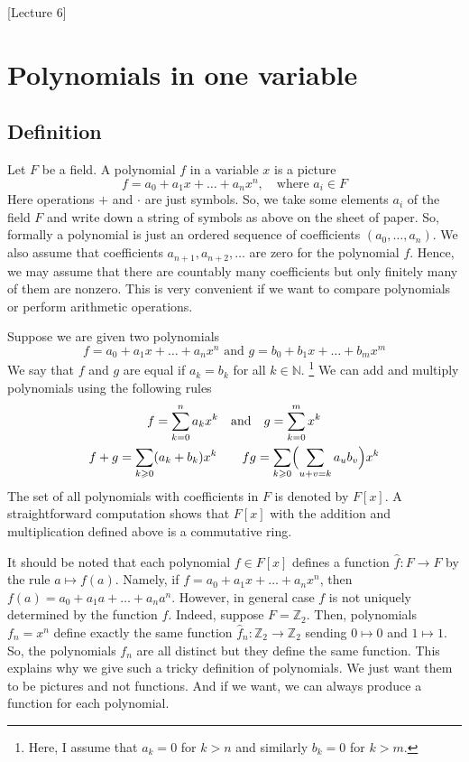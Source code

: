[Lecture 6]


\section{Polynomials in one variable}

\subsection{Definition}

Let $F$ be a field.
A polynomial $f$ in a variable $x$ is a picture
\[
f = a_0 + a_1 x + \ldots + a_n x^n,\quad \text{where } a_i \in F
\]
Here operations $+$ and $\cdot$ are just symbols.
So, we take some elements $a_i$ of the field $F$ and write down a string of symbols as above on the sheet of paper.
So, formally a polynomial is just an ordered sequence of coefficients $(a_0,\ldots,a_n)$.
We also assume that coefficients $a_{n+1},a_{n+2},\ldots$ are zero for the polynomial $f$.
Hence, we may assume that there are countably many coefficients but only finitely many of them are nonzero.
This is very convenient if we want to compare polynomials or perform arithmetic operations.

Suppose we are given two polynomials
\[
f = a_0 + a_1 x + \ldots + a_n x^n\text{ and } g = b_0 + b_1 x + \ldots + b_m x^m
\]
We say that $f$ and $g$ are equal if $a_k = b_k$ for all $k\in \mathbb N$.%
\footnote{Here, I assume that $a_k = 0$ for $ k > n$ and similarly $b_k = 0$ for $k > m$.}
We can add and multiply polynomials using the following rules
\begin{gather*}
f = \sum_{k=0}^n a_k x^k\quad\text{and}\quad g = \sum_{k=0}^m x^k\\
f + g = \sum_{k \geqslant 0} (a_k + b_k) x^k\quad\quad
f g = \sum_{k\geqslant 0}\Bigl( \sum_{u + v = k} a_u b_v\Bigl) x^k
\end{gather*}
The set of all polynomials with coefficients in $F$ is denoted by $F[x]$.
A straightforward computation shows that $F[x]$ with the addition and multiplication defined above is a commutative ring.

\begin{remark}
It should be noted that each polynomial $f\in F[x]$ defines a function $\hat f\colon F\to F$ by the rule $a \mapsto f(a)$.
Namely, if $f = a_0 + a_1 x + \ldots + a_n x^n$, then $f(a) = a_0 + a_1 a + \ldots + a_n a^n$.
However, in general case $f$ is not uniquely determined by the function $\hat f$.
Indeed, suppose $F = \mathbb Z_2$.
Then, polynomials $f_n = x^n$ define exactly the same function $\hat f_n \colon \mathbb Z_2 \to \mathbb Z_2$ sending $0\mapsto 0$ and $1\mapsto 1$.
So, the polynomials $f_n$ are all distinct but they define the same function.
This explains why we give such a tricky definition of polynomials.
We just want them to be pictures and not functions.
And if we want, we can always produce a function for each polynomial.
\end{remark}

